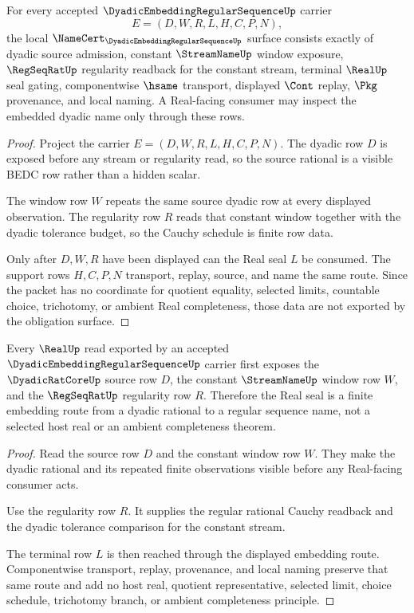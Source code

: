 \begin{theorem}
\label{thm:dyadic-embedding-regular-sequence-obligation-surface}
For every accepted $\DyadicEmbeddingRegularSequenceUp$ carrier
$$
E=(D,W,R,L,H,C,P,N),
$$
the local $\NameCert_{\DyadicEmbeddingRegularSequenceUp}$ surface consists exactly of dyadic source admission, constant $\StreamNameUp$ window exposure, $\RegSeqRatUp$ regularity readback for the constant stream, terminal $\RealUp$ seal gating, componentwise $\hsame$ transport, displayed $\Cont$ replay, $\Pkg$ provenance, and local naming. A Real-facing consumer may inspect the embedded dyadic name only through these rows.
\end{theorem}
\begin{proof}
Project the carrier $E=(D,W,R,L,H,C,P,N)$. The dyadic row $D$ is exposed before any stream or regularity read, so the source rational is a visible BEDC row rather than a hidden scalar.

The window row $W$ repeats the same source dyadic row at every displayed observation. The regularity row $R$ reads that constant window together with the dyadic tolerance budget, so the Cauchy schedule is finite row data.

Only after $D,W,R$ have been displayed can the Real seal $L$ be consumed. The support rows $H,C,P,N$ transport, replay, source, and name the same route. Since the packet has no coordinate for quotient equality, selected limits, countable choice, trichotomy, or ambient Real completeness, those data are not exported by the obligation surface.
\end{proof}

\begin{theorem}
\label{thm:dyadic-embedding-regular-sequence-real-seal}
Every $\RealUp$ read exported by an accepted $\DyadicEmbeddingRegularSequenceUp$ carrier first exposes the $\DyadicRatCoreUp$ source row $D$, the constant $\StreamNameUp$ window row $W$, and the $\RegSeqRatUp$ regularity row $R$. Therefore the Real seal is a finite embedding route from a dyadic rational to a regular sequence name, not a selected host real or an ambient completeness theorem.
\end{theorem}
\begin{proof}
Read the source row $D$ and the constant window row $W$. They make the dyadic rational and its repeated finite observations visible before any Real-facing consumer acts.

Use the regularity row $R$. It supplies the regular rational Cauchy readback and the dyadic tolerance comparison for the constant stream.

The terminal row $L$ is then reached through the displayed embedding route. Componentwise transport, replay, provenance, and local naming preserve that same route and add no host real, quotient representative, selected limit, choice schedule, trichotomy branch, or ambient completeness principle.
\end{proof}

